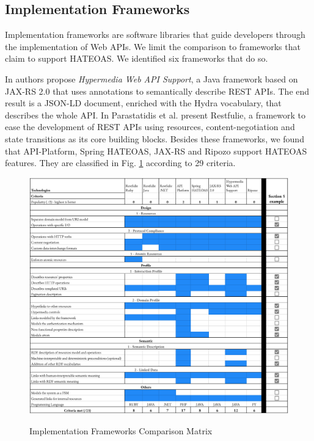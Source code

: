 \subsection{Implementation Frameworks}

Implementation frameworks are software libraries that guide developers through the implementation of Web APIs. We limit the comparison to frameworks that claim to support HATEOAS. We identified six frameworks that do so.

In \cite{salvadori2014framework} authors propose \textit{Hypermedia Web API Support}, a Java framework based on JAX-RS 2.0 that uses annotations to semantically describe REST APIs. The end result is a JSON-LD document, enriched with the Hydra vocabulary, that describes the whole API. In \cite{parastatidis2010role} Parastatidis et al. present Restfulie, a framework to ease the development of REST APIs using resources, content-negotiation and state transitions as its core building blocks. Besides these frameworks, we found that API-Platform, Spring HATEOAS, JAX-RS and Ripozo support HATEOAS features. They are classified in Fig. \ref{frameworks-matrix} according to 29 criteria. %

\begin{figure}[ht]
\caption{Implementation Frameworks Comparison Matrix}
\includegraphics[width=1\textwidth]{figures/frameworks.png}
\label{frameworks-matrix}
\end{figure}

